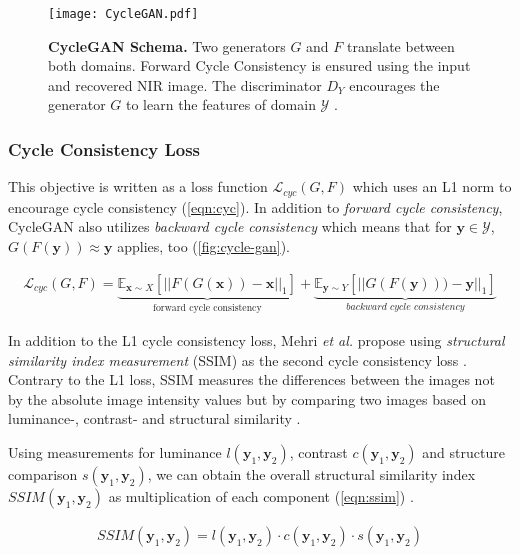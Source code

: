 \documentclass[a4paper,11pt, DIV=12]{scrartcl}
\newcommand{\x}{\boldsymbol{x}}
\newcommand{\y}{\boldsymbol{y}}
\begin{document}
\begin{figure}[h]
   \texttt{[image: CycleGAN.pdf]}
   \caption{
      \textbf{CycleGAN Schema.} Two generators $G$ and $F$ translate between both domains. Forward Cycle Consistency is ensured using the input and recovered NIR image.
      The discriminator $D_Y$ encourages the generator $G$ to learn the features of domain $\mathcal{Y}$ \cite{cyclegan_orig,mehri2019colorizing}.
   }
   \label{fig:cycle-gan}
\end{figure}

\subsubsection*{Cycle Consistency Loss}
This objective is written as a loss function $\mathcal{L}_{cyc}(G, F)$ which uses an L1 norm to encourage cycle consistency (\autoref{eqn:cyc}).
In addition to \textit{forward cycle consistency}, CycleGAN also utilizes \textit{backward cycle consistency} which means that for $\y \in \mathcal{Y}$, $G(F(\y)) \approx \y$ \cite{cyclegan_orig} applies, too (\autoref{fig:cycle-gan}).

\begin{equation}
   \label{eqn:cyc}
   \begin{aligned}
      \mathcal{L}_{cyc}(G, F) = \underbrace{\mathbb{E}_{\x \sim X}\left[||F(G(\x)) - \x||_1\right]}_{\text{forward cycle consistency}} +
      \underbrace{\mathbb{E}_{\y \sim Y}\left[||G(F(\y))) - \y||_1\right]}_{\textit{backward cycle consistency}}
   \end{aligned}
\end{equation}

In addition to the L1 cycle consistency loss, Mehri \textit{et al.} propose using \textit{structural similarity index measurement} (SSIM) as the second cycle consistency loss \cite{mehri2019colorizing}.
Contrary to the L1 loss, SSIM measures the differences between the images not by the absolute image intensity values but by comparing two images based on luminance-, contrast- and structural similarity \cite{ssim}.

Using measurements for luminance $l(\y_1, \y_2)$, contrast $c(\y_1,\y_2)$ and structure comparison $s(\y_1, \y_2)$, we can obtain the overall structural similarity
index $SSIM(\y_1, \y_2)$ as multiplication of each component (\autoref{eqn:ssim}) \cite{ssim}.

\begin{equation}
   \label{eqn:ssim}
   \begin{aligned}
      SSIM(\y_1, \y_2) = l(\y_1, \y_2) \cdot c(\y_1,\y_2) \cdot s(\y_1, \y_2)
   \end{aligned}
\end{equation}
\end{document}
